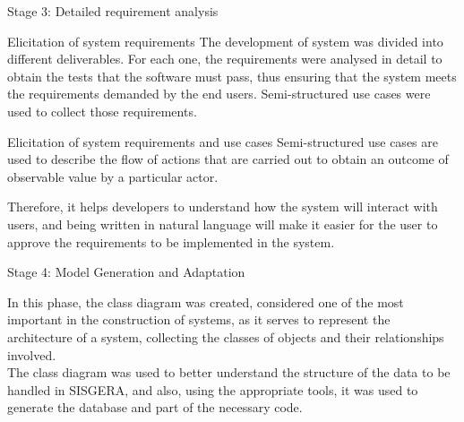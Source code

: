 \documentclass[notes=show, 10pt]{beamer}
\begin{document}
    \begin{frame}{Stage 3: Detailed requirement analysis }
        \begin{block}{Elicitation of system requirements}
            The development of system was divided into different deliverables. For each one, the requirements were analysed in detail to obtain the tests that the software must pass, thus ensuring that the system meets the requirements demanded by the end users. Semi-structured use cases were used to collect those requirements.
        \end{block}
        \begin{block}{Elicitation of system requirements and use cases}
            Semi-structured use cases are used to describe the flow of actions that are carried out to obtain an outcome of observable value by a particular actor.
            
            Therefore, it helps developers to understand how the system will interact with users, and being written in natural language will make it easier for the user to approve the requirements to be implemented in the system.
        \end{block}
    \end{frame}
    
    
     \begin{frame}{Stage 4: Model Generation and Adaptation}
        \begin{block}{}
            In this phase, the class diagram was created, considered one of the most important in the construction of systems, as it serves to represent the architecture of a system, collecting the classes of objects and their relationships involved.\\
            The class diagram was used to better understand the structure of the data to be handled in SISGERA, and also, using the appropriate tools, it was used to generate the database and part of the necessary code.
        \end{block}
    \end{frame}
    
\end{document}
